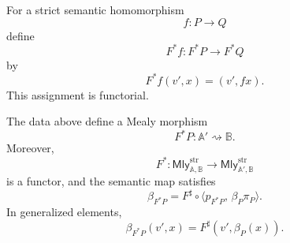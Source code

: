 For a strict semantic homomorphism
\[
    f:P\to Q
\]
define
\[
    F^*f:F^*P\to F^*Q
\]
by
\[
    F^*f(v',x)=(v',fx).
\]
This assignment is functorial.

\begin{proposition}
\label{prop:input-pullback-mealy}
    The data above define a Mealy morphism
    \[
        F^*P:\mathbb A'\rightsquigarrow\mathbb B.
    \]
    Moreover,
    \[
        F^*:\mathsf{Mly}^{\mathrm{str}}_{\mathbb A,\mathbb B}
        \to
        \mathsf{Mly}^{\mathrm{str}}_{\mathbb A',\mathbb B}
    \]
    is a functor, and the semantic map satisfies
    \[
        \beta_{F^*P}
        =
        F^\sharp
        \circ
        \langle p_{F^*P},\,\beta_P\pi_P\rangle.
    \]
    In generalized elements,
    \[
        \beta_{F^*P}(v',x)
        =
        F^\sharp(v',\beta_P(x)).
    \]
\end{proposition}

